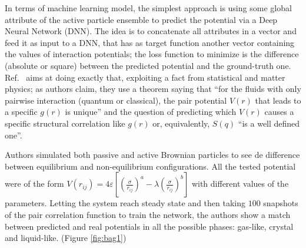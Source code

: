 \documentclass[../../master_thesis_np.tex]{subfiles}
\begin{document}
	In terms of machine learning model, the simplest approach is using some global attribute of the active particle ensemble to predict the potential via a Deep Neural Network (DNN). %
	The idea is to concatenate all attributes in a vector and feed it as input to a DNN, that has as target function another vector containing the values of interaction potentials; the loss function to minimize is the difference (absolute or square) between the predicted potential and the ground-truth one.
	Ref.\ \cite{bag_interaction_2021} aims at doing exactly that, exploiting a fact from statistical and matter physics; as authors claim, they use a theorem saying that \enquote{for the fluids with only pairwise interaction (quantum or classical), the pair potential $V(r)$ that leads to a specific $g(r)$ is unique} and the question of predicting which $V(r)$ causes a specific structural correlation like $g(r)$ or, equivalently, $S(q)$ \enquote{is a well defined one}. 
	
	Authors simulated both passive and active Brownian particles to see de difference between equilibrium and non-equilibrium configurations. 
	All the tested potential were of the form $V(r_{ij}) = 4\varepsilon \left[ \left( \frac{\sigma}{r_{ij}} \right)^a - \lambda \left( \frac{\sigma}{r_{ij}} \right)^b \right]$ with different values of the parameters. 
	Letting the system reach steady state and then taking $100$ snapshots of the pair correlation function to train the network, the authors show a match between predicted and real potentials in all the possible phases: gas-like, crystal and liquid-like. (Figure \ref{fig:bag1})
	
\end{document}
